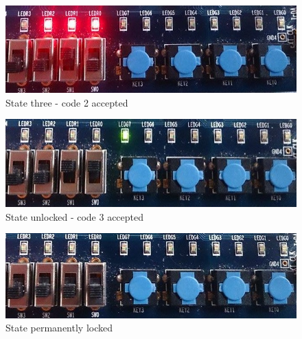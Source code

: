 \begin{enumerate}
\begin{figure}[h]
	\centering
	\includegraphics[scale=0.5]{pictures/Oevelse7/opg2/StateThree.JPG}
	\caption{State three - code 2 accepted}
	\label{fig:}
\end{figure}

\begin{figure}[h]
	\centering
	\includegraphics[scale=0.5]{pictures/Oevelse7/opg2/StateUnlocked.JPG}
	\caption{State unlocked - code 3 accepted}
	\label{fig:}
\end{figure}

\begin{figure}[h]
	\centering
	\includegraphics[scale=0.5]{pictures/Oevelse7/opg2/StatePermLocked.JPG}
	\caption{State permanently locked}
	\label{fig:}
\end{figure}

\end{enumerate}
	